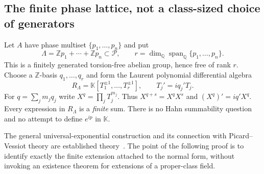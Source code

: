 \documentclass[11pt,a4paper]{article}
\numberwithin{equation}{section}
\theoremstyle{definition}
\theoremstyle{remark}
\newcommand{\K}{\mathbb K}
\newcommand{\Q}{\mathbb Q}
\newcommand{\Z}{\mathbb Z}
\newcommand{\PP}{\mathcal P}
\newcommand{\Span}{\operatorname{span}}
\begin{document}
\subsection{The finite phase lattice, not a class-sized choice of generators}
Let $A$ have phase multiset $\{p_1,\ldots,p_n\}$ and put
\[
 \Lambda=\Z p_1+\cdots+\Z p_n\subset\PP,
 \qquad r=\dim_{\Q}\Span_{\Q}\{p_1,\ldots,p_n\}.
\]
This is a finitely generated torsion-free abelian group, hence free of
rank $r$. Choose a $\Z$-basis $q_1,\ldots,q_r$ and form the Laurent
polynomial differential algebra
\begin{equation}\label{eq:PVring}
 R_\Lambda=\K[T_1^{\pm1},\ldots,T_r^{\pm1}],
 \qquad T_j'=i q_j'T_j.
\end{equation}
For $q=\sum_jm_jq_j$ write $X^q=\prod_jT_j^{m_j}$. Thus
$X^{q+s}=X^qX^s$ and $(X^q)'=iq'X^q$. Every expression in $R_\Lambda$
is a \emph{finite} sum. There is no Hahn summability question and no
attempt to define $e^{ip}$ in $\K$.

The general universal-exponential construction and its connection with
Picard--Vessiot theory are established theory~\cite[\S2.4]{ADHNorm}.
The point of the following proof is to identify exactly the finite
extension attached to the normal form, without invoking an existence
theorem for extensions of a proper-class field.
\end{document}
